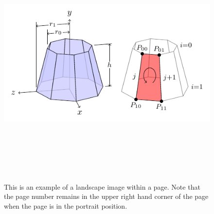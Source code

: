 \begin{figure}
\centering
\includegraphics[height=5.0in, width=7.5in]{casestudy/figures/3d-cone.pdf}
\caption{This is an example of a landscape image within a page.  Note that the page number remains in the upper right hand corner of the page when the page is in the portrait position.}
\end{figure}